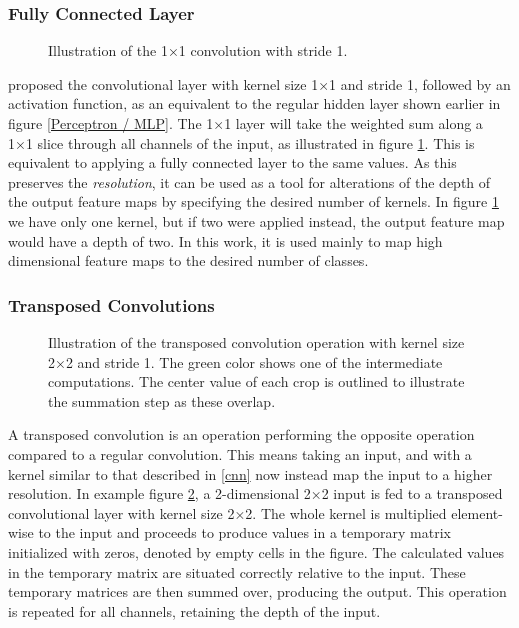 \subsubsection{Fully Connected Layer}
    \begin{figure}[H]
        \centering
        
        \caption[1×1 convolution]{Illustration of the 1×1 convolution with stride 1.}
      	\medskip 
        \label{1x1_fig}
    \end{figure}
    \citeauthor{lin2013network_in_network_1x1}\cite{lin2013network_in_network_1x1} proposed the convolutional layer with kernel size 1×1 and stride 1, followed by an activation function, as an equivalent to the regular hidden layer shown earlier in figure \ref{Perceptron / MLP}. The 1×1 layer will take the weighted sum along a 1×1 slice through all channels of the input, as illustrated in figure \ref{1x1_fig}. This is equivalent to applying a fully connected layer to the same values. As this preserves the \textit{resolution}, it can be used as a tool for alterations of the depth of the output feature maps by specifying the desired number of kernels. In figure \ref{1x1_fig} we have only one kernel, but if two were applied instead, the output feature map would have a depth of two. In this work, it is used mainly to map high dimensional feature maps to the desired number of classes.
    
    

\subsubsection{Transposed Convolutions}
    \begin{figure}[H]
        \centering
        
        
        
        \caption[Transposed convolution]{Illustration of the transposed convolution operation with kernel size 2×2 and stride 1. The green color shows one of the intermediate computations. The center value of each crop is outlined to illustrate the summation step as these overlap.}
      	\medskip 
        \label{transposed_conv_fig}
    \end{figure}
    A transposed convolution is an operation performing the opposite operation compared to a regular convolution\cite{dumoulin2016guide_transposed_convolution}. This means taking an input, and with a kernel similar to that described in \ref{cnn} now instead map the input to a higher resolution. In example figure \ref{transposed_conv_fig}, a 2-dimensional 2×2 input is fed to a transposed convolutional layer with kernel size 2×2. The whole kernel is multiplied element-wise to the input and proceeds to produce values in a temporary matrix initialized with zeros, denoted by empty cells in the figure. The calculated values in the temporary matrix are situated correctly relative to the input. These temporary matrices are then summed over, producing the output. This operation is repeated for all channels, retaining the depth of the input. 
    

